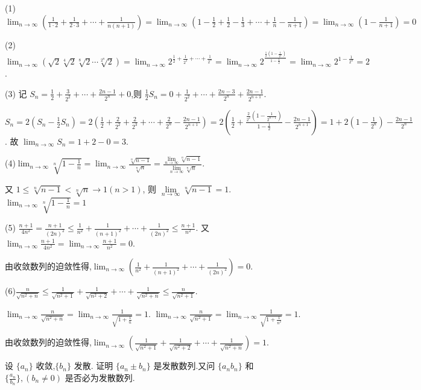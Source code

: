\begin{solve}
    (1) $\lim_{n\to\infty} (\frac{1}{1\cdot 2}+\frac{1}{2\cdot 3}+\cdots+\frac{1}{n(n+1)})=\lim_{n\to\infty} (1-\frac{1}{2}+\frac{1}{2}-\frac{1}{3}+\cdots+\frac{1}{n}-\frac{1}{n+1})=\lim_{n\to\infty} (1-\frac{1}{n+1})=0$

    (2) $\lim_{n\to\infty} (\sqrt{2}\sqrt[4]{2}\sqrt[8]{2}\cdots \sqrt[2^n]{2})=\lim_{n\to\infty} 2^{\frac{1}{2}+\frac{1}{2^2}+\cdots+\frac{1}{2^n}}=\lim_{n\to\infty} 2^{\frac{\frac{1}{2}(1-\frac{1}{2^n})}{1-\frac{1}{2}}}=\lim_{n\to\infty} 2^{1-\frac{1}{2^n}}=2$.

    (3) 记 $S_n=\frac{1}{2}+\frac{3}{2^2}+\cdots+\frac{2n-1}{2^n}+0$,则 $\frac{1}{2}S_n=0+\frac{1}{2^2}+\cdots+\frac{2n-3}{2^n}+\frac{2n-1}{2^{n+1}}$. 
    
    $S_n=2(S_n-\frac{1}{2}S_n)=2(\frac{1}{2}+\frac{2}{2^2}+\frac{2}{2^3}+\cdots+\frac{2}{2^n}-\frac{2n-1}{2^{n+1}})=2(\frac{1}{2}+\frac{\frac{2}{2^2}(1-\frac{1}{2^{n-1}})}{1-\frac{1}{2}}-\frac{2n-1}{2^{n+1}})=1+2(1-\frac{1}{2^n})-\frac{2n-1}{2^n}$. 故 $\lim_{n\to\infty} S_n=1+2-0=3$.

    (4)$\lim_{n\to\infty} \sqrt[n]{1-\frac{1}{n}}=\lim_{n\to\infty} \frac{\sqrt[n]{n-1}}{\sqrt[n]{n}}=\frac{\lim\limits_{n\to\infty} \sqrt[n]{n-1}}{\lim\limits_{n\to\infty}\sqrt[n]{n}}$. 
    
    又 $1\le \sqrt[n]{n-1} < \sqrt[n]{n}\to 1(n>1)$, 则 $\lim\limits_{n\to\infty} \sqrt[n]{n-1}=1$. $\lim_{n\to\infty} \sqrt[n]{1-\frac{1}{n}}=1$

    (5) $\frac{n+1}{4n^2}=\frac{n+1}{(2n)^2}\le \frac{1}{n^2}+\frac{1}{(n+1)^2}+\cdots+\frac{1}{(2n)^2} \le \frac{n+1}{n^2}$. 又 $\lim_{n\to\infty} \frac{n+1}{4n^2}=\lim_{n\to\infty} \frac{n+1}{n^2}=0$.
    
    由收敛数列的迫敛性得,$\lim_{n\to\infty} (\frac{1}{n^2}+\frac{1}{(n+1)^2}+\cdots+\frac{1}{(2n)^2})=0$.

    (6)$\frac{n}{\sqrt{n^2+n}}\le \frac{1}{\sqrt{n^2+1}}+\frac{1}{\sqrt{n^2+2}}+\cdots+\frac{1}{\sqrt{n^2+n}}\le \frac{n}{\sqrt{n^2+1}}$. 
    
    $\lim_{n\to\infty} \frac{n}{\sqrt{n^2+n}}=\lim_{n\to\infty} \frac{1}{\sqrt{1+\frac{1}{n}}}=1$. $\lim_{n\to\infty} \frac{n}{\sqrt{n^2+1}}=\lim_{n\to\infty} \frac{1}{\sqrt{1+\frac{1}{n^2}}}=1$.

    由收敛数列的迫敛性得,$\lim_{n\to\infty} (\frac{1}{\sqrt{n^2+1}}+\frac{1}{\sqrt{n^2+2}}+\cdots+\frac{1}{\sqrt{n^2+n}})=1$.
\end{solve}

\begin{practice}
    设 $\{a_n\}$ 收敛,$\{b_n\}$ 发散. 证明 $\{a_n\pm b_n\}$ 是发散数列.又问 $\{a_nb_n\} $ 和 $\{\frac{a_n}{b_n}\},(b_n\ne 0)$ 是否必为发散数列.
\end{practice}

